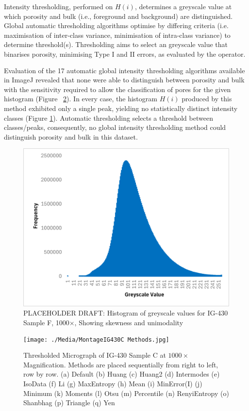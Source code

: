 \documentclass[review]{elsarticle}
\begin{document}
Intensity thresholding, performed on \(H(i)\), determines a greyscale value at
which porosity and bulk (i.e., foreground and background) are distinguished.
Global automatic thresholding algorithms optimise by differing criteria (i.e.
maximisation of inter-class variance, minimisation of intra-class variance) to
determine threshold(s). Thresholding aims to select an greyscale value that
binarises porosity, minimising Type I and II errors, as evaluated by the
operator.

Evaluation of the 17 automatic global intensity thresholding algorithms
available in ImageJ revealed that none were able to distinguish between porosity
and bulk with the sensitivity required to allow the classification of pores for
the given histogram (Figure ~\ref{fig:Try All Thresholding Methods}). In every
case, the histogram \(H(i)\) produced by this method exhibited only a single
peak, yielding no statistically distinct intensity classes (Figure
\ref{fig:histogramnobimodal}). Automatic thresholding selects a threshold
between classes/peaks, consequently, no global intensity thresholding method
could distinguish porosity and bulk in this dataset.

    \begin{figure}
		\centering
    \includegraphics[width=0.9\columnwidth]{./Media/IG430F Greyscale Histogram.png}
		\caption{PLACEHOLDER DRAFT: Histogram of greyscale values for IG-430 Sample F, 1000×, Showing skewness and unimodality}
		\label{fig:histogramnobimodal}
	\end{figure} 

	\begin{figure}[!htbp]
		\centering
		\texttt{[image: ./Media/MontageIG430C Methods.jpg]}
		\caption{Thresholded Micrograph of IG-430 Sample C at $1000\times$ Magnification. Methods are placed sequentially from right to left, row by row. 
      (a) Default
			(b) Huang
			(c) Huang2
			(d) Intermodes
			(e) IsoData
			(f) Li
			(g) MaxEntropy
			(h) Mean
			(i) MinError(I)
			(j) Minimum
			(k) Moments
			(l) Otsu
			(m) Percentile
			(n) RenyiEntropy
			(o) Shanbhag
			(p) Triangle
			(q) Yen}
		\label{fig:Try All Thresholding Methods}
	\end{figure}  
\end{document}
